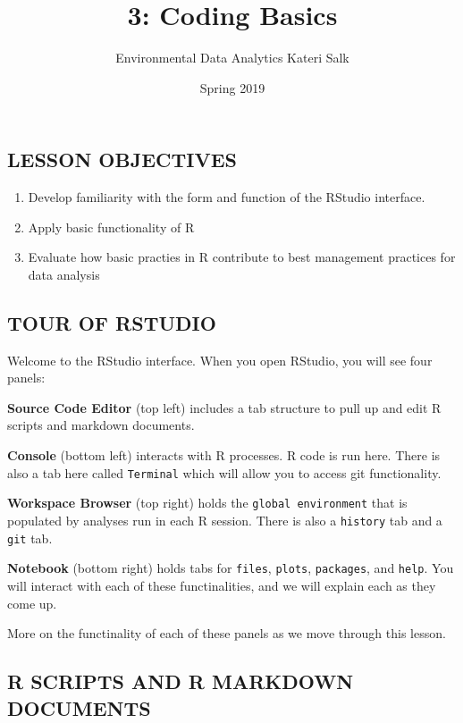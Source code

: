 \documentclass[]{article}
\title{3: Coding Basics}
\author{Environmental Data Analytics \textbar{} Kateri Salk}
\date{Spring 2019}
\providecommand{\tightlist}{%
  \setlength{\itemsep}{0pt}\setlength{\parskip}{0pt}}
\begin{document}
\maketitle

\subsection{LESSON OBJECTIVES}\label{lesson-objectives}

\begin{enumerate}
\def\labelenumi{\arabic{enumi}.}
\tightlist
\item
  Develop familiarity with the form and function of the RStudio
  interface.
\item
  Apply basic functionality of R
\item
  Evaluate how basic practies in R contribute to best management
  practices for data analysis
\end{enumerate}

\subsection{TOUR OF RSTUDIO}\label{tour-of-rstudio}

Welcome to the RStudio interface. When you open RStudio, you will see
four panels:

\textbf{Source Code Editor} (top left) includes a tab structure to pull
up and edit R scripts and markdown documents.

\textbf{Console} (bottom left) interacts with R processes. R code is run
here. There is also a tab here called \texttt{Terminal} which will allow
you to access git functionality.

\textbf{Workspace Browser} (top right) holds the
\texttt{global\ environment} that is populated by analyses run in each R
session. There is also a \texttt{history} tab and a \texttt{git} tab.

\textbf{Notebook} (bottom right) holds tabs for \texttt{files},
\texttt{plots}, \texttt{packages}, and \texttt{help}. You will interact
with each of these functinalities, and we will explain each as they come
up.

More on the functinality of each of these panels as we move through this
lesson.

\subsection{R SCRIPTS AND R MARKDOWN
DOCUMENTS}\label{r-scripts-and-r-markdown-documents}
\end{document}
